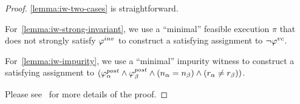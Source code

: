\begin{proof}

\ref{lemma:iw-two-cases} is straightforward.

For~\ref{lemma:iw-strong-invariant}, we use a ``minimal'' feasible execution $\pi$ that does not strongly satisfy $\varphi^{inv}$
to construct a satisfying assignment to $\neg \varphi^{vc}$.

For~\ref{lemma:iw-impurity}, we use a ``minimal'' impurity witness to construct a satisfying assignment to
$(\varphi^{post}_\alpha \wedge \varphi^{post}_\beta \wedge (n_\alpha = n_\beta) \wedge (r_\alpha \neq r_\beta))$.

Please see~\cite{CheckingOP:arxiv} for more details of the proof.

%
%
\end{proof}
